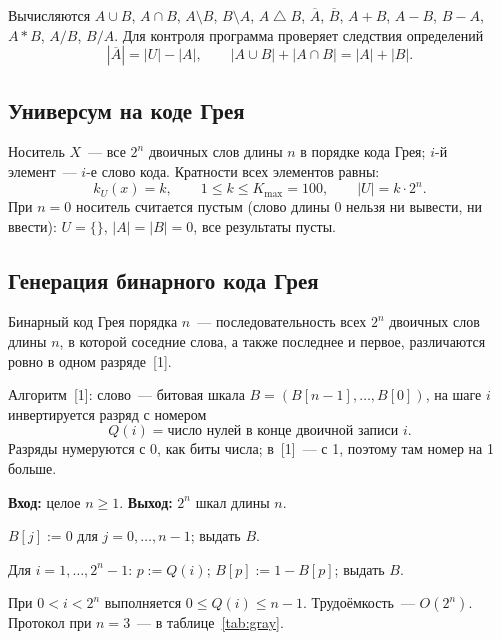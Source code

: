\documentclass[14pt,a4paper]{extarticle}
\newcommand{\kU}{k_U(x)}
\newcommand{\Kmax}{K_{\max}}
\begin{document}
Вычисляются $A \cup B$, $A \cap B$, $A \setminus B$, $B \setminus A$, $A \mathbin{\triangle} B$, $\overline{A}$, $\overline{B}$, $A + B$, $A - B$, $B - A$, $A \ast B$, $A / B$, $B / A$. Для контроля программа проверяет следствия определений
\begin{equation}
|\overline{A}| = |U| - |A|, \qquad |A \cup B| + |A \cap B| = |A| + |B|. \label{eq:check}
\end{equation}

\subsection{Универсум на коде Грея}
\label{sec:universe}

Носитель $X$~--- все $2^n$ двоичных слов длины $n$ в порядке кода Грея; $i$-й элемент~--- $i$-е слово кода. Кратности всех элементов равны:
\begin{equation}
\kU = k, \qquad 1 \leqslant k \leqslant \Kmax = 100, \qquad |U| = k \cdot 2^n. \label{eq:ucard}
\end{equation}
При $n = 0$ носитель считается пустым (слово длины 0 нельзя ни вывести, ни ввести): $U = \{\}$, $|A| = |B| = 0$, все результаты пусты.

\subsection{Генерация бинарного кода Грея}
\label{sec:gray}

Бинарный код Грея порядка $n$~--- последовательность всех $2^n$ двоичных слов длины $n$, в которой соседние слова, а также последнее и первое, различаются ровно в одном разряде~[1].

Алгоритм~[1]: слово~--- битовая шкала $B = (B[n-1], \ldots, B[0])$, на шаге $i$ инвертируется разряд с номером
\begin{equation}
Q(i) = \text{число нулей в конце двоичной записи } i. \label{eq:q}
\end{equation}
Разряды нумеруются с 0, как биты числа; в~[1]~--- с 1, поэтому там номер на 1 больше.

\textbf{Вход:} целое $n \geqslant 1$. \textbf{Выход:} $2^n$ шкал длины $n$.
\begin{steps}
\item $B[j] := 0$ для $j = 0, \ldots, n - 1$; выдать $B$.
\item Для $i = 1, \ldots, 2^n - 1$: $p := Q(i)$; $B[p] := 1 - B[p]$; выдать $B$.
\end{steps}
При $0 < i < 2^n$ выполняется $0 \leqslant Q(i) \leqslant n - 1$. Трудоёмкость~--- $O(2^n)$. Протокол при $n = 3$~--- в таблице~\ref{tab:gray}.
\end{document}
